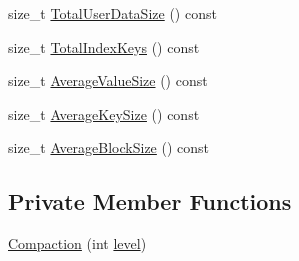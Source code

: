 \begin{DoxyCompactItemize}
\item 
size\+\_\+t \hyperlink{classleveldb_1_1_compaction_a934cbc1df4eb9c2f9d6e72a20c64c9bf}{Total\+User\+Data\+Size} () const 
\item 
size\+\_\+t \hyperlink{classleveldb_1_1_compaction_abec7bb553e996597ab98865165a38ea1}{Total\+Index\+Keys} () const 
\item 
size\+\_\+t \hyperlink{classleveldb_1_1_compaction_a16bf31d07df694c84209631e4094be86}{Average\+Value\+Size} () const 
\item 
size\+\_\+t \hyperlink{classleveldb_1_1_compaction_a6734555cd6de84728b5259b509164f79}{Average\+Key\+Size} () const 
\item 
size\+\_\+t \hyperlink{classleveldb_1_1_compaction_a8f1f7b408739995fe7166c25ce0b37d0}{Average\+Block\+Size} () const 
\end{DoxyCompactItemize}
\subsection*{Private Member Functions}
\begin{DoxyCompactItemize}
\item 
\hyperlink{classleveldb_1_1_compaction_adc68ea88defa6187764838e73836b9e6}{Compaction} (int \hyperlink{classleveldb_1_1_compaction_aaf72769cc8dabece3e513399425f91fa}{level})
\end{DoxyCompactItemize}

